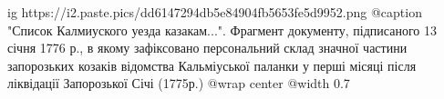  
 
 
 
 

\ifcmt
  ig https://i2.paste.pics/dd6147294db5e84904fb5653fe5d9952.png
  @caption "Список Калмиуского уезда казакам...". Фрагмент документу, підписаного 13 січня 1776 р., в якому зафіксовано персональний склад значної частини запорозьких козаків відомства Кальміуської паланки у перші місяці після ліквідації Запорозької Січі (1775р.)
  @wrap center
  @width 0.7
\fi
